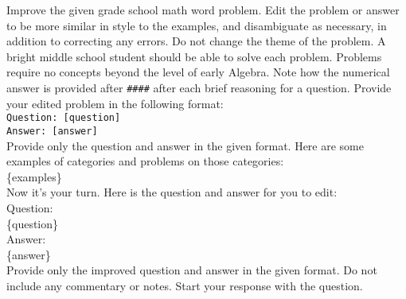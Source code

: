 \begin{tcolorbox}[colback=green!5!white,colframe=green!75!black,title=Refine Prompt]
Improve the given grade school math word problem. Edit the problem or answer to be more similar in style to the examples, and disambiguate as necessary, in addition to correcting any errors. Do not change the theme of the problem. A bright middle school student should be able to solve each problem. Problems require no concepts beyond the level of early Algebra. Note how the numerical answer is provided after \texttt{\#\#\#\#} after each brief reasoning for a question. Provide your edited problem in the following format:\\

\texttt{Question: [question]} \\
\texttt{Answer: [answer]}\\

Provide only the question and answer in the given format. Here are some examples of categories and problems on those categories:\\

\{examples\}\\

Now it's your turn. Here is the question and answer for you to edit:\\
Question:\\
\{question\}\\
Answer:\\
\{answer\}\\

Provide only the improved question and answer in the given format. Do not include any commentary or notes. Start your response with the question.
\end{tcolorbox}
